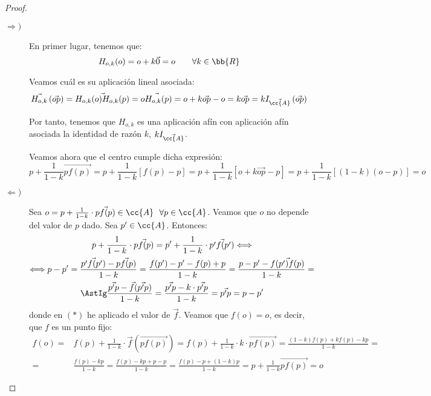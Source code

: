 \begin{proof}\
    \begin{description}
        \item[$\Longrightarrow)$] En primer lugar, tenemos que:
        \begin{equation*}
            H_{o,k}(o)=o+k\vec{0} = o \qquad \forall k\in \bb{R}
        \end{equation*}
        
        Veamos cuál es su aplicación lineal asociada:
        \begin{equation*}
            \vec{H_{o,k}}\left(\vec{op}\right) = \vec{H_{o,k}(o)H_{o,k}(p)} = \vec{oH_{o,k}(p)} = o+k\vec{op} -o = k\vec{op} = kI_{\vec{\cc{A}}}\left(\vec{op}\right)
        \end{equation*}
        
        Por tanto, tenemos que $H_{o,k}$ es una aplicación afín con aplicación afín asociada la identidad de razón $k$, $kI_{\vec{\cc{A}}}$.

        Veamos ahora que el centro cumple dicha expresión:
        \begin{equation*}
            p+\frac{1}{1-k}\vec{pf(p)} = p + \frac{1}{1-k}[f(p)-p]
            = p + \frac{1}{1-k}[o+k\vec{op}-p]
            = p + \frac{1}{1-k}[(1-k)(o-p)] = o
        \end{equation*}

        \item[$\Longleftarrow)$] Sea $o=p+\frac{1}{1-k}\cdot \vec{pf(p)}\in \cc{A}~~\forall p\in \cc{A}$.
        Veamos que $o$ no depende del valor de $p$ dado. 
        Sea $p'\in \cc{A}$. Entonces:
        \begin{multline*}
            p+\frac{1}{1-k}\cdot \vec{pf(p)} = p'+\frac{1}{1-k}\cdot \vec{p'f(p')} \Longleftrightarrow \\ \Longleftrightarrow
            p-p' = \frac{\vec{p'f(p')} - \vec{pf(p)}}{1-k}
            = \frac{f(p')-p'-f(p)+p}{1-k}
            = \frac{p-p' - \vec{f(p')f(p)}}{1-k}
            =\\\AstIg \frac{\vec{p'p} - \vec{f}(\vec{p'p})}{1-k} = \frac{\vec{p'p} - k\cdot \vec{p'p}}{1-k} = \vec{p'p} = p-p'
        \end{multline*}
        donde en $(\ast)$ he aplicado el valor de $\vec{f}$. Veamos que $f(o)=o$, es decir, que $f$ es un punto fijo:
        \begin{equation*}\begin{split}
            f(o)=&f(p)  +\frac{1}{1-k}\cdot \vec{f}(\vec{pf(p)})
            =f(p)  +\frac{1}{1-k}\cdot k\cdot \vec{pf(p)}
            =\frac{(1-k)f(p) + kf(p) - kp}{1-k} =\\
            =&\frac{f(p) - kp}{1-k}
            =\frac{f(p) - kp + p-p}{1-k}
            =\frac{f(p)-p + (1-k)p}{1-k} = p + \frac{1}{1-k}\vec{pf(p)} = o
        \end{split}\end{equation*}


\end{description}
\end{proof}
